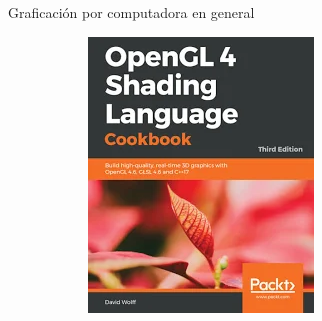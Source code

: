 \begin{frame}{Graficación por computadora en general}
\begin{figure}[htp]
\begin{subfigure}[b]{0.12\textwidth}
   \includegraphics[width=\textwidth]{img/shaderBook}
 \end{subfigure}
\end{figure}
\end{frame}
